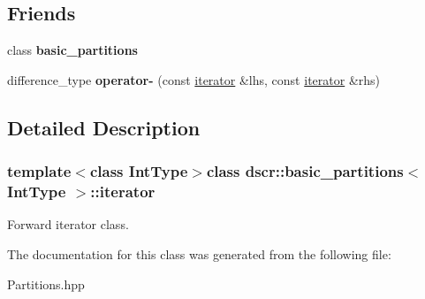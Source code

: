 \subsection*{Friends}
\begin{DoxyCompactItemize}
\item 
\hypertarget{classdscr_1_1basic__partitions_1_1iterator_aa61a5712b0e94d9ea6b10b06e861e942}{class {\bfseries basic\-\_\-partitions}}\label{classdscr_1_1basic__partitions_1_1iterator_aa61a5712b0e94d9ea6b10b06e861e942}

\item 
\hypertarget{classdscr_1_1basic__partitions_1_1iterator_a4304f5d7bb1d12de2d2ad2c1e4e64dab}{difference\-\_\-type {\bfseries operator-\/} (const \hyperlink{classdscr_1_1basic__partitions_1_1iterator}{iterator} \&lhs, const \hyperlink{classdscr_1_1basic__partitions_1_1iterator}{iterator} \&rhs)}\label{classdscr_1_1basic__partitions_1_1iterator_a4304f5d7bb1d12de2d2ad2c1e4e64dab}

\end{DoxyCompactItemize}


\subsection{Detailed Description}
\subsubsection*{template$<$class Int\-Type$>$class dscr\-::basic\-\_\-partitions$<$ Int\-Type $>$\-::iterator}

Forward iterator class. 

The documentation for this class was generated from the following file\-:\begin{DoxyCompactItemize}
\item 
Partitions.\-hpp\end{DoxyCompactItemize}
